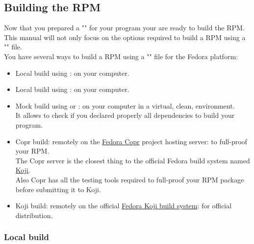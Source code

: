 \newpage
\subsection{Building the RPM}

Now that you prepared a "" for your program your are ready to build the RPM. \\
This manual will not only focus on the options required to build a RPM using a "" file. \\[0.25cm]
You have several ways to build a RPM using a "" file for the Fedora platform:
\begin{itemize}
\item Local build using : on your computer.
\item Local build using : on your computer.
\item Mock build using  or : on your computer in a virtual, clean, environment.\\ 
It allows to check if you declared properly all dependencies to build your program.
\item Copr build: remotely on the \href{https://copr.fedorainfracloud.org}{Fedora Copr} project hosting server: to full-proof your RPM. \\
The Copr server is the closest thing to the official Fedora build system named \href{https://koji.fedoraproject.org/koji}{Koji}. \\
Also Copr has all the testing tools required to full-proof your RPM package before submitting it to Koji. 
\item Koji build: remotely on the official \href{https://koji.fedoraproject.org/koji}{Fedora Koji build system}: for official distribution.
\end{itemize}

\subsubsection{Local build}

